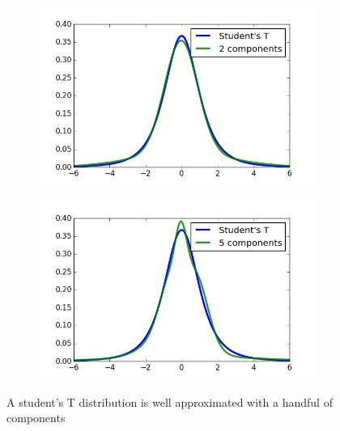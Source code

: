 \documentclass[11pt,a4paper]{book}
\begin{document}
\begin{figure}[h]
  \centering
  \begin{subfigure}{0.45\textwidth}
    \centering
    \includegraphics[width=\textwidth]{thesis/em/t-2-components}
  \end{subfigure}
  \hfill
  \begin{subfigure}{0.45\textwidth}
    \centering
    \includegraphics[width=\textwidth]{thesis/em/t-5-components}
  \end{subfigure}
  \caption{A student's T distribution is well approximated with a handful of
    components}
  \label{fig:em-students-t}
\end{figure}
\end{document}
